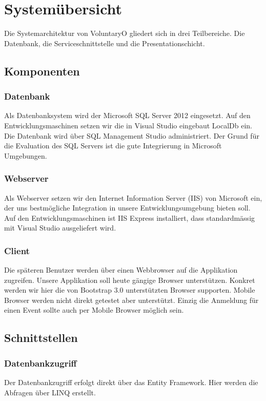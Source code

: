 \chapter{Systemübersicht}
	Die Systemarchitektur von VoluntaryO gliedert sich in drei Teilbereiche. Die Datenbank, die Serviceschnittstelle und die Presentationschicht.
	\section{Komponenten}
		\subsection{Datenbank}
		Als Datenbanksystem wird der Microsoft SQL Server 2012 eingesetzt. Auf den Entwicklungsmaschinen setzen wir die in Visual Studio eingebaut LocalDb ein. Die Datenbank wird über SQL Management Studio administriert. Der Grund für die Evaluation des SQL Servers ist die gute Integrierung in Microsoft Umgebungen.
		\subsection{Webserver}
		Als Webserver setzen wir den Internet Information Server (IIS) von Microsoft ein, der uns bestmögliche Integration in unsere Entwicklungsumgebung bieten soll. Auf den Entwicklungsmaschinen ist IIS Express installiert, dass standardmässig mit Visual Studio ausgeliefert wird.
		\subsection{Client}
		Die späteren Benutzer werden über einen Webbrowser auf die Applikation zugreifen. Unsere Applikation soll heute gängige Browser unterstützen. Konkret werden wir hier die von Bootstrap 3.0 unterstützten Browser supporten. Mobile Browser werden nicht direkt getestet aber unterstützt. Einzig die Anmeldung für einen Event sollte auch per Mobile Browser möglich sein.

	\section{Schnittstellen}
		\subsection{Datenbankzugriff}
		Der Datenbankzugriff erfolgt direkt über das Entity Framework. Hier werden die Abfragen über LINQ erstellt.

